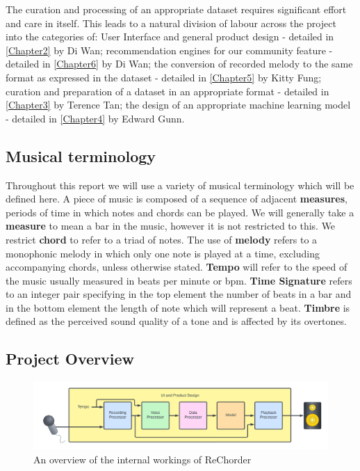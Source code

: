 The curation and processing of an appropriate dataset requires significant effort and care in itself.
This leads to a natural division of labour across the project into the categories of:
\label{sec:Introduction}
User Interface and general product design - detailed in \cref{Chapter2} by Di Wan;
recommendation engines for our community feature - detailed in \cref{Chapter6} by Di Wan;
the conversion of recorded melody to the same format as expressed in the dataset - detailed in \cref{Chapter5} by Kitty Fung;
curation and preparation of a dataset in an appropriate format - detailed in \cref{Chapter3} by Terence Tan;
the design of an appropriate machine learning model - detailed in \cref{Chapter4} by Edward Gunn.



\subsection{Musical terminology}
Throughout this report we will use a variety of musical terminology which will be defined here. A piece of music is composed of a sequence of adjacent \textbf{measures}, periods of time in which notes and chords can be played. 
We will generally take a \textbf{measure} to mean a bar in the music, however it is not restricted to this. We restrict \textbf{chord} to refer to a triad of notes.%
 The use of \textbf{melody} refers to a monophonic melody in which only one note is played at a time, excluding accompanying chords, unless otherwise stated.
\textbf{Tempo} will refer to the speed of the music usually measured in beats per minute or bpm.
\textbf{Time Signature} refers to an integer pair specifying in the top element the number of beats in a bar and in the bottom element the length of note which will represent a beat.
\textbf{Timbre} is defined as the perceived sound quality of a tone and is affected by its overtones.

\subsection{Project Overview}
\label{Project Overview}
\begin{figure}
    \centering
    \includegraphics[width=0.8\columnwidth]{Figures/Project Overview}
    \decoRule
    \caption[]{An overview of the internal workings of ReChorder}
    \label{fig:MVPOverview}
\end{figure}

